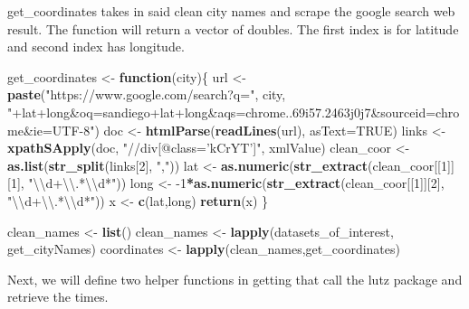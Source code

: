 \documentclass[
]{book}
\newenvironment{Shaded}{\begin{snugshade}}{\end{snugshade}}
\newcommand{\CharTok}[1]{\textcolor[rgb]{0.31,0.60,0.02}{#1}}
\newcommand{\ControlFlowTok}[1]{\textcolor[rgb]{0.13,0.29,0.53}{\textbf{#1}}}
\newcommand{\DataTypeTok}[1]{\textcolor[rgb]{0.13,0.29,0.53}{#1}}
\newcommand{\DecValTok}[1]{\textcolor[rgb]{0.00,0.00,0.81}{#1}}
\newcommand{\KeywordTok}[1]{\textcolor[rgb]{0.13,0.29,0.53}{\textbf{#1}}}
\newcommand{\NormalTok}[1]{#1}
\newcommand{\OperatorTok}[1]{\textcolor[rgb]{0.81,0.36,0.00}{\textbf{#1}}}
\newcommand{\OtherTok}[1]{\textcolor[rgb]{0.56,0.35,0.01}{#1}}
\newcommand{\StringTok}[1]{\textcolor[rgb]{0.31,0.60,0.02}{#1}}
\begin{document}
get\_coordinates takes in said clean city names and scrape the google search web result. The function will return a vector of doubles. The first index is for latitude and second index has longitude.

\begin{Shaded}
\begin{Highlighting}[]
\NormalTok{get_coordinates <-}\StringTok{ }\ControlFlowTok{function}\NormalTok{(city)\{}
\NormalTok{  url <-}\StringTok{ }
\StringTok{    }\KeywordTok{paste}\NormalTok{(}\StringTok{"https://www.google.com/search?q="}\NormalTok{,}
\NormalTok{          city,}
          \StringTok{"+lat+long&oq=sandiego+lat+long&aqs=chrome..69i57.2463j0j7&sourceid=chrome&ie=UTF-8"}\NormalTok{)}
\NormalTok{  doc <-}\StringTok{ }\KeywordTok{htmlParse}\NormalTok{(}\KeywordTok{readLines}\NormalTok{(url), }\DataTypeTok{asText=}\OtherTok{TRUE}\NormalTok{)}
\NormalTok{  links <-}\StringTok{ }\KeywordTok{xpathSApply}\NormalTok{(doc, }\StringTok{"//div[@class='kCrYT']"}\NormalTok{, xmlValue)}
\NormalTok{  clean_coor <-}\StringTok{ }\KeywordTok{as.list}\NormalTok{(}\KeywordTok{str_split}\NormalTok{(links[}\DecValTok{2}\NormalTok{], }\StringTok{","}\NormalTok{))}
\NormalTok{  lat <-}\StringTok{ }\KeywordTok{as.numeric}\NormalTok{(}\KeywordTok{str_extract}\NormalTok{(clean_coor[[}\DecValTok{1}\NormalTok{]][}\DecValTok{1}\NormalTok{], }\StringTok{"}\CharTok{\textbackslash{}\textbackslash{}}\StringTok{d+}\CharTok{\textbackslash{}\textbackslash{}}\StringTok{.*}\CharTok{\textbackslash{}\textbackslash{}}\StringTok{d*"}\NormalTok{))}
\NormalTok{  long <-}\StringTok{ }\DecValTok{-1}\OperatorTok{*}\KeywordTok{as.numeric}\NormalTok{(}\KeywordTok{str_extract}\NormalTok{(clean_coor[[}\DecValTok{1}\NormalTok{]][}\DecValTok{2}\NormalTok{], }\StringTok{"}\CharTok{\textbackslash{}\textbackslash{}}\StringTok{d+}\CharTok{\textbackslash{}\textbackslash{}}\StringTok{.*}\CharTok{\textbackslash{}\textbackslash{}}\StringTok{d*"}\NormalTok{))}
\NormalTok{  x <-}\StringTok{ }\KeywordTok{c}\NormalTok{(lat,long)}
  \KeywordTok{return}\NormalTok{(x)}
\NormalTok{\}}

\NormalTok{clean_names <-}\StringTok{ }\KeywordTok{list}\NormalTok{()}
\NormalTok{clean_names <-}\StringTok{ }\KeywordTok{lapply}\NormalTok{(datasets_of_interest, get_cityNames)}
\NormalTok{coordinates <-}\StringTok{ }\KeywordTok{lapply}\NormalTok{(clean_names,get_coordinates)}
\end{Highlighting}
\end{Shaded}

Next, we will define two helper functions in getting that call the lutz package and retrieve the times.
\end{document}
